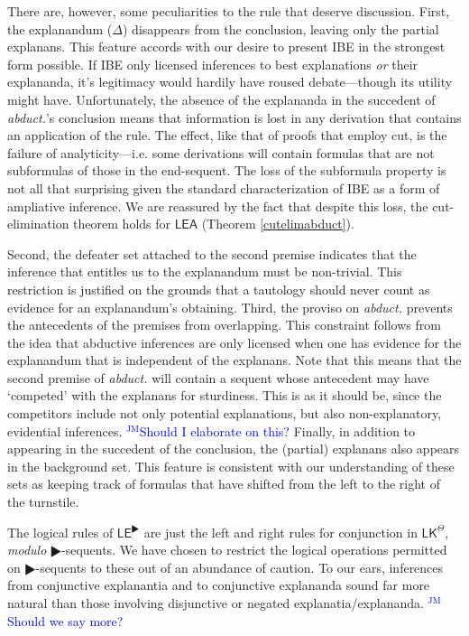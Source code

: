 \documentclass{article}
\theoremstyle{definition}
\theoremstyle{definition}
\theoremstyle{definition}
\theoremstyle{definition}
\theoremstyle{remark}
\theoremstyle{definition}
\theoremstyle{definition}
\newcommand{\jm}[1]{\textcolor{blue}{$^{\textrm{JM}}${#1}}}
\begin{document}
There are, however, some peculiarities to the rule that deserve discussion. First, the explanandum ($ \Delta $) disappears from the conclusion, leaving only the partial explanans. This feature accords with our desire to present IBE in the strongest form possible. If IBE only licensed inferences to best explanations \textit{or} their explananda, it's legitimacy would hardily have roused debate---though its utility might have. Unfortunately, the absence of the explananda in the succedent of \textit{abduct.}'s conclusion means that information is lost in any derivation that contains an application of the rule. The effect, like that of proofs that employ cut, is the failure of analyticity---i.e. some derivations will contain formulas that are not subformulas of those in the end-sequent. The loss of the subformula property is not all that surprising given the standard characterization of IBE as a form of ampliative inference. We are reassured by the fact that despite this loss, the cut-elimination theorem holds for $ \mathsf{LEA} $ (Theorem \ref{cutelimabduct}).

Second, the defeater set attached to the second premise indicates that the inference that entitles us to the explanandum must be non-trivial. This restriction is justified on the grounds that a tautology should never count as evidence for an explanandum's obtaining.  Third, the proviso on \textit{abduct.} prevents the antecedents of the premises from overlapping. This constraint follows from the idea that abductive inferences are only licensed when one has evidence for the explanandum that is independent of the explanans. Note that this means that the second premise of \textit{abduct.} will contain a sequent whose antecedent may have `competed' with the explanans for sturdiness. This is as it should be, since the competitors include not only potential explanations, but also non-explanatory, evidential inferences. \jm{Should I elaborate on this?} Finally, in addition to appearing in the succedent of the conclusion, the (partial) explanans also appears in the background set. This feature is consistent with our understanding of these sets as keeping track of formulas that have shifted from the left to the right of the turnstile.




The logical rules of $ \mathsf{LE}^\RHD $ are just the left and right rules for conjunction in $\mathsf{LK^\Theta}$, \textit{modulo} $ \RHD$-sequents. We have chosen to restrict the logical operations permitted on $ \RHD$-sequents to these out of an abundance of caution. To our ears, inferences from conjunctive explanantia and to conjunctive explananda sound far more natural than those involving disjunctive or negated explanatia/explananda. \jm{Should we say more?}
\end{document}
